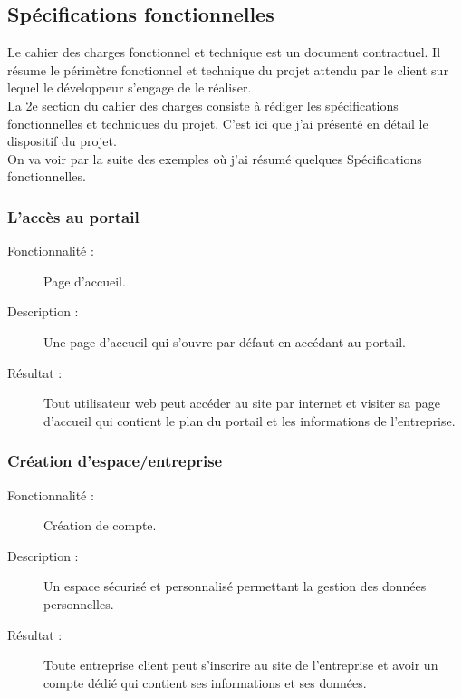 \documentclass[12pt]{article}
\begin{document}
\subsection{ Spécifications fonctionnelles}


Le cahier des charges fonctionnel et technique est un document contractuel. Il résume le périmètre fonctionnel et technique du projet attendu par le client sur lequel le développeur s’engage de le réaliser.\\
La 2e section du cahier des charges consiste à rédiger les spécifications fonctionnelles et techniques du projet. C’est ici que j'ai  présenté en détail le dispositif du projet. \\

On va voir par la suite  des exemples où j'ai résumé quelques Spécifications fonctionnelles.

\subsubsection{L'accès au portail}
 
\begin{description}

\item[Fonctionnalité :] Page d'accueil.

\item[Description :] Une page d’accueil qui s'ouvre par
défaut en accédant au portail.

\item[Résultat :]  Tout utilisateur web peut accéder au site  par internet et visiter sa  page d'accueil qui contient le plan du portail et les informations de l'entreprise.

\end{description}


\subsubsection{ Création d’espace/entreprise}


\begin{description}

\item[Fonctionnalité :] Création de compte.

\item[Description :]  Un espace sécurisé et personnalisé permettant la gestion des données personnelles.

\item[Résultat :]  Toute entreprise client peut s'inscrire
au site de l'entreprise et avoir un compte dédié qui contient ses informations et ses données.

\end{description}
\end{document}
